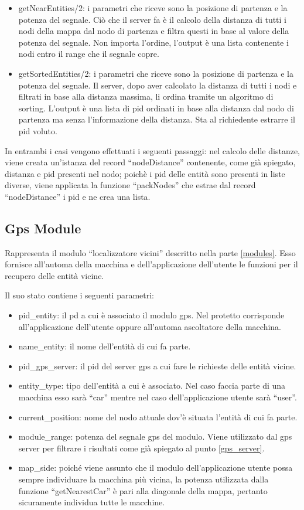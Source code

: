 \begin{itemize}
	\item getNearEntities/2: i parametri che riceve sono la posizione di partenza e la potenza del segnale. Ciò che il server fa è il calcolo della distanza di tutti i nodi della mappa dal nodo di partenza e filtra questi in base al valore della potenza del segnale. Non importa l'ordine, l'output è una lista contenente i nodi entro il range che il segnale copre.
	\item getSortedEntities/2: i parametri che riceve sono la posizione di partenza e la potenza del segnale. Il server, dopo aver calcolato la distanza di tutti i nodi e filtrati in base alla distanza massima, li ordina tramite un algoritmo di sorting. L'output è una lista di pid ordinati in base alla distanza dal nodo di partenza ma senza l'informazione della distanza. Sta al richiedente estrarre il pid voluto.
\end{itemize}

In entrambi i casi vengono effettuati i seguenti passaggi: nel calcolo delle distanze, viene creata un'istanza del record ``nodeDistance'' contenente, come già spiegato, distanza e pid presenti nel nodo; poichè i pid delle entità sono presenti in liste diverse, viene applicata la funzione ``packNodes'' che estrae dal record ``nodeDistance'' i pid e ne crea una lista.

\subsection{Gps Module}\label{gps_module}
Rappresenta il modulo ``localizzatore vicini'' descritto nella parte \ref{modules}. Esso fornisce all'automa della macchina e dell'applicazione dell'utente le funzioni per il recupero delle entità vicine.

Il suo stato contiene i seguenti parametri:
\begin{itemize}
	\item pid\_entity: il pd a cui è associato il modulo gps. Nel protetto corrisponde all'applicazione dell'utente oppure all'automa ascoltatore della macchina.
	\item name\_entity: il nome dell'entità di cui fa parte.
	\item pid\_gps\_server: il pid del server gps a cui fare le richieste delle entità vicine.
	\item entity\_type: tipo dell'entità a cui è associato. Nel caso faccia parte di una macchina esso sarà ``car'' mentre nel caso dell'applicazione utente sarà ``user''.
	\item current\_position: nome del nodo attuale dov'è situata l'entità di cui fa parte.
	\item module\_range: potenza del segnale gps del modulo. Viene utilizzato dal gps server per filtrare i risultati come già spiegato al punto \ref{gps_server}.
	\item map\_side: poiché viene assunto che il modulo dell'applicazione utente possa sempre individuare la macchina più vicina, la potenza utilizzata dalla funzione ``getNearestCar'' è pari alla diagonale della mappa, pertanto sicuramente individua tutte le macchine.
\end{itemize}

